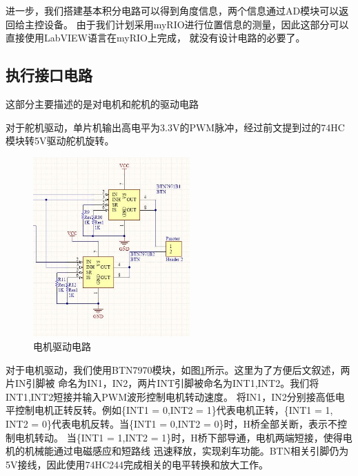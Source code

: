 \documentclass[a4paper]{paper}
\begin{document}
进一步，我们搭建基本积分电路可以得到角度信息，两个信息通过AD模块可以返回给主控设备。
由于我们计划采用myRIO进行位置信息的测量，因此这部分可以直接使用LabVIEW语言在myRIO上完成，
就没有设计电路的必要了。

\subsection{执行接口电路}
这部分主要描述的是对电机和舵机的驱动电路

对于舵机驱动，单片机输出高电平为3.3V的PWM脉冲，经过前文提到过的74HC模块转5V驱动舵机旋转。

\begin{figure}
    \centering
    \includegraphics[width =60mm]{../preview/motor1.jpg}
    \caption{电机驱动电路}
    \label{motor1}
\end{figure}
对于电机驱动，我们使用BTN7970模块，如图\ref{motor1}所示。这里为了方便后文叙述，两片IN引脚被
命名为IN1，IN2，两片INT引脚被命名为INT1,INT2。我们将INT1,INT2短接并输入PWM波形控制电机转动速度。
将IN1，IN2分别接高低电平控制电机正转反转。例如\{INT1 = 0,INT2 = 1\}代表电机正转，\{INT1 = 1,
INT2 = 0\}代表电机反转。当\{INT1 = 0,INT2 = 0\}时，H桥全部关断，表示不控制电机转动。
当\{INT1 = 1,INT2 = 1\}时，H桥下部导通，电机两端短接，使得电机的机械能通过电磁感应和短路线
迅速释放，实现刹车功能。BTN相关引脚仍为5V接线，因此使用74HC244完成相关的电平转换和放大工作。
\end{document}
